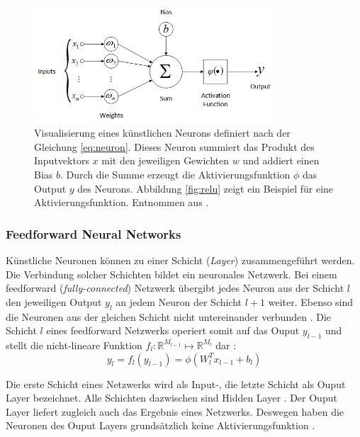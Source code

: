 \begin{figure}
	\centering
	\includegraphics[width=0.8\textwidth]{images/ann_conv/neuron.png}
	\caption{Visualisierung eines künstlichen Neurons definiert nach der Gleichung \ref{eq:neuron}. Dieses Neuron summiert das Produkt des Inputvektors $x$ mit den jeweiligen Gewichten $w$ und addiert einen Bias $b$. Durch die Summe erzeugt die Aktivierungsfunktion $\phi$ das Output $y$ des Neurons. Abbildung \ref{fig:relu} zeigt ein Beispiel für eine Aktivierungsfunktion. Entnommen aus \cite{deoliveiraSystemBasedArtificial2017}. }
	\label{fig:neuron}
\end{figure}

\subsubsection{Feedforward Neural Networks}
\label{sec:feedforwardNN}
Künstliche Neuronen können zu einer Schicht (\textit{Layer}) zusammengeführt werden. Die Verbindung solcher Schichten bildet ein neuronales Netzwerk.
Bei einem feedforward (\textit{fully-connected}) Netzwerk übergibt jedes Neuron aus der Schicht $l$ den jeweiligen Output $y_{l}$ an jedem Neuron der Schicht $l+1$ weiter. Ebenso sind die Neuronen aus der gleichen Schicht nicht untereinander verbunden \cite{goodfellowDeepLearning2016}.
Die Schicht $l$ eines feedforward Netzwerks operiert somit auf das Ouput $y_{l-1}$ und stellt die nicht-lineare Funktion $f_l : \mathbb{R}^{M_{l-1}} \mapsto \mathbb{R}^{M_l}$ dar \cite{bauckhageInformedMachineLearning}:
\begin{equation}
\label{eq:layer}
y_l = f_l(y_{l-1}) = \phi(W^T_lx_{l-1}+b_{l})
\end{equation}


Die erste Schicht eines Netzwerks wird als Input-, die letzte Schicht als Ouput Layer bezeichnet. Alle Schichten dazwischen sind Hidden Layer \cite{goodfellowDeepLearning2016}. Der Ouput Layer liefert zugleich auch das Ergebnis eines Netzwerks. Deswegen haben die Neuronen des Ouput Layers grundsätzlich keine Aktivierungsfunktion \cite{johnsonCS231nConvolutionalNeural}.

